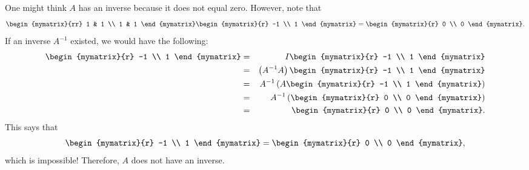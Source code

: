 \begin{solution}
  One might think $A$ has an inverse because it does not equal zero.
  However, note that
  \begin{equation*}
    \begin{mymatrix}{rr}
      1 & 1 \\
      1 & 1
    \end{mymatrix} \begin{mymatrix}{r}
      -1 \\
      1
    \end{mymatrix} =\begin{mymatrix}{r}
      0 \\
      0
    \end{mymatrix}.
  \end{equation*}
  If an inverse $A^{-1}$ existed, we would have the following:
  \begin{eqnarray*}
    \begin{mymatrix}{r}
      -1 \\
      1
    \end{mymatrix}
    &=&
        I\begin{mymatrix}{r}
          -1 \\
          1
        \end{mymatrix} \\
    &=&
        \tup{A^{-1}A} \begin{mymatrix}{r}
          -1 \\
          1
        \end{mymatrix} \\
    &=&
        A^{-1}\tup{A\begin{mymatrix}{r}
            -1 \\
            1
          \end{mymatrix} } \\
    &=&
        A^{-1}\tup{\begin{mymatrix}{r}
            0 \\
            0
          \end{mymatrix} } \\
    &=&
        \begin{mymatrix}{r}
          0 \\
          0
        \end{mymatrix}.
\end{eqnarray*}
  This says that 
  \begin{equation*}
    \begin{mymatrix}{r}
      -1 \\
      1
    \end{mymatrix}
    =
    \begin{mymatrix}{r}
      0 \\
      0
    \end{mymatrix},
  \end{equation*}
  which is impossible! Therefore, $A$ does not have an inverse.
\end{solution}


